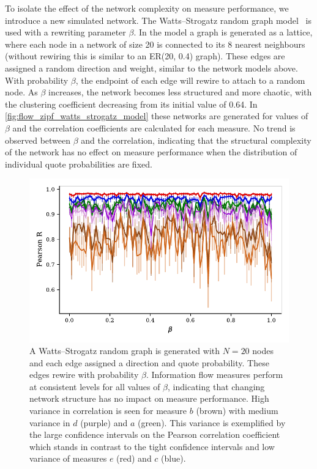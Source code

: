 To isolate the effect of the network complexity on measure performance, we introduce a new simulated network. The Watts–Strogatz random graph model~\cite{watts_collective_1998} is used with a rewriting parameter $\beta$. In the model a graph is generated as a lattice, where each node in a network of size 20 is connected to its 8 nearest neighbours (without rewiring this is similar to an ER(20, 0.4) graph). These edges are assigned a random direction and weight, similar to the network models above. With probability $\beta$, the endpoint of each edge will rewire to attach to a random node. As $\beta$ increases, the network becomes less structured and more chaotic, with the clustering coefficient decreasing from its initial value of 0.64. In \autoref{fig:flow_zipf_watts_strogatz_model} these networks are generated for values of $\beta$ and the correlation coefficients are calculated for each measure. No trend is observed between $\beta$ and the correlation, indicating that the structural complexity of the network has no effect on measure performance when the distribution of individual quote probabilities are fixed. 

\begin{figure}[!htbp]
	\centering
	\includegraphics{chapter3/figs/zipf_watts_strogatz.pdf}
	\caption{A Watts–Strogatz random graph is generated with $N=20$ nodes and each edge assigned a direction and quote probability. These edges rewire with probability $\beta$. Information flow measures perform at consistent levels for all values of $\beta$, indicating that changing network structure has no impact on measure performance. 
	High variance in correlation is seen for measure {\color{brown}$b$ (brown)} with medium variance in {\color{violet}$d$ (purple)} and {\color{green!80!black}$a$ (green)}. This variance is exemplified by the large confidence intervals on the Pearson correlation coefficient which stands in contrast to the tight confidence intervals and low variance of measures {\color{red}$e$ (red)} and {\color{blue!80!black}$c$ (blue)}.}
	\label{fig:flow_zipf_watts_strogatz_model}
\end{figure}

